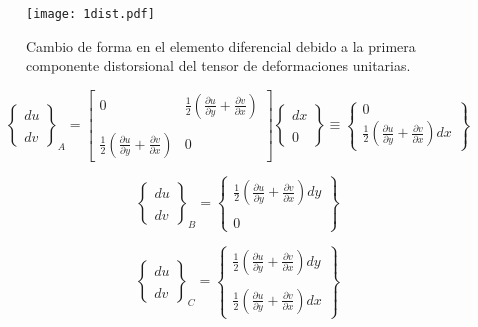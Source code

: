 \documentclass[../notas medios.tex]{subfiles}
\begin{document}
\begin{figure}[H]
\centering
	\texttt{[image: 1dist.pdf]}
	\caption{Cambio de forma en el elemento diferencial debido a la primera componente distorsional del tensor de deformaciones unitarias.}
	\label{1dist}
\end{figure}

\[{\left\{ {\begin{array}{*{20}{c}}
{du}\\\\
{dv}
\end{array}} \right\}_A} = \left[ {\begin{array}{*{20}{c}}
0&{\frac{1}{2}\left( {\frac{{\partial u}}{{\partial y}} + \frac{{\partial v}}{{\partial x}}} \right)}\\\\
{\frac{1}{2}\left( {\frac{{\partial u}}{{\partial y}} + \frac{{\partial v}}{{\partial x}}} \right)}&0
\end{array}} \right]\left\{ {\begin{array}{*{20}{c}}
{dx}\\\\
0
\end{array}} \right\} \equiv \left\{ {\begin{array}{*{20}{c}}
0\\
{\frac{1}{2}\left( {\frac{{\partial u}}{{\partial y}} + \frac{{\partial v}}{{\partial x}}} \right)dx}
\end{array}} \right\}\]

\[{\left\{ {\begin{array}{*{20}{c}}
{du}\\\\
{dv}
\end{array}} \right\}_B} = \left\{ {\begin{array}{*{20}{c}}
{\frac{1}{2}\left( {\frac{{\partial u}}{{\partial y}} + \frac{{\partial v}}{{\partial x}}} \right)dy}\\\\
0
\end{array}} \right\}\]

\[{\left\{ {\begin{array}{*{20}{c}}
{du}\\\\
{dv}
\end{array}} \right\}_C} = \left\{ {\begin{array}{*{20}{c}}
{\frac{1}{2}\left( {\frac{{\partial u}}{{\partial y}} + \frac{{\partial v}}{{\partial x}}} \right)dy}\\\\
{\frac{1}{2}\left( {\frac{{\partial u}}{{\partial y}} + \frac{{\partial v}}{{\partial x}}} \right)dx}
\end{array}} \right\}\]
\end{document}
